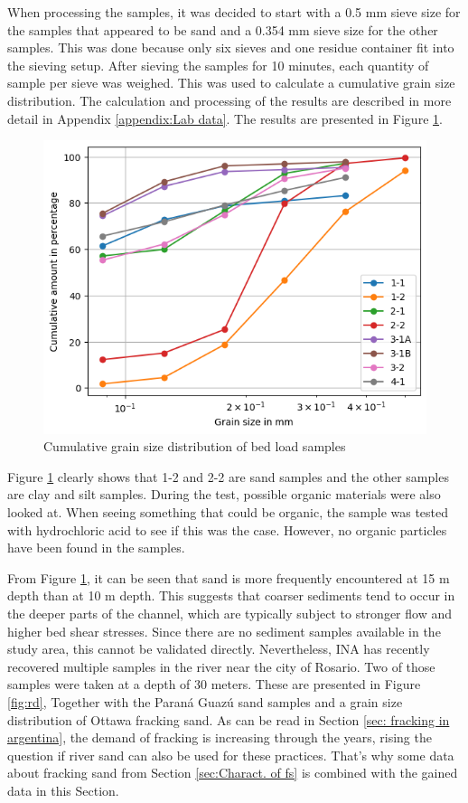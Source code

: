 When processing the samples, it was decided to start with a 0.5 mm sieve size for the samples that appeared to be sand and a 0.354 mm sieve size for the other samples. This was done because only six sieves and one residue container fit into the sieving setup. After sieving the samples for 10 minutes, each quantity of sample per sieve was weighed. This was used to calculate a cumulative grain size distribution. The calculation and processing of the results are  described in more detail in Appendix \ref{appendix:Lab data}. The results are presented in Figure \ref{fig:Cumu}.


\begin{figure}[H]
    \centering
    \includegraphics[width=0.75\linewidth]{figures//ch6/CUMU.png}
    \caption{Cumulative grain size distribution of bed load samples}
    \label{fig:Cumu}
\end{figure}

Figure \ref{fig:Cumu} clearly shows that 1-2 and 2-2 are sand samples and the other samples are clay and silt samples. During the test, possible organic materials were also looked at. When seeing something that could be organic, the sample was tested with hydrochloric acid to see if this was the case. However, no organic particles have been found in the samples. 

From Figure \ref{fig:Cumu}, it can be seen that sand is more frequently encountered at 15 m depth than at 10 m depth. This suggests that coarser sediments tend to occur in the deeper parts of the channel, which are typically subject to stronger flow and higher bed shear stresses. Since there are no sediment samples available in the study area, this cannot be validated directly. Nevertheless, INA has recently recovered multiple samples in the river near the city of Rosario. Two of those samples were taken at a depth of 30 meters. These are presented in Figure \ref{fig:rd}, Together with the Paraná Guazú sand samples and a grain size distribution of Ottawa fracking sand. As can be read in Section \ref{sec: fracking in argentina}, the demand of fracking is increasing through the years, rising the question if river sand can also be used for these practices.
That's why some data about fracking sand from Section \ref{sec:Charact. of fs} is combined with the gained data in this Section. 

